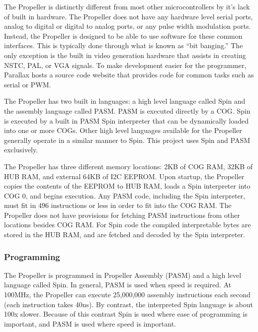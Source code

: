 \documentclass{article}
\numberwithin{equation}{section} %
\begin{document}
The Propeller is distinctly different from most other microcontrollers by it's lack of built in hardware. The Propeller does not have any hardware level serial ports, analog to digital or digital to analog ports, or any pulse width modulation ports. Instead, the Propeller is designed to be able to use software for these common interfaces. This is typically done through what is known as “bit banging.” The only exception is the built in video generation hardware that assists in creating NSTC, PAL, or VGA signals. To make development easier for the programmer, Parallax hosts a source code website that provides code for common tasks such as serial or PWM.

The Propeller has two built in languages: a high level language called Spin and the assembly language called PASM. PASM is executed directly by a COG. Spin is executed by a built in PASM Spin interpreter that can be dynamically loaded into one or more COGs. Other high level languages available for the Propeller generally operate in a similar manner to Spin. This project uses Spin and PASM exclusively.

The Propeller has three different memory locations: 2KB of COG RAM, 32KB of HUB RAM, and external 64KB of I2C EEPROM. Upon startup, the Propeller copies the contents of the EEPROM to HUB RAM, loads a Spin interpreter into COG 0, and begins execution.  Any PASM code, including the Spin interpreter, must fit in 496 instructions or less in order to fit into the COG RAM. The Propeller does not have provisions for fetching PASM instructions from other locations besides COG RAM. For Spin code the compiled interpretable bytes are stored in the HUB RAM, and are fetched and decoded by the Spin interpreter.

\subsubsection{Programming}

The Propeller is programmed in Propeller Assembly (PASM) and a high level language called Spin. In general, PASM is used when speed is required. At 100MHz, the Propeller can execute 25,000,000 assembly instructions each second (each instruction takes 40ns). By contrast, the interpreted Spin language is about 100x slower. Because of this contrast Spin is used where ease of programming is important, and PASM is used where speed is important.
\end{document}
